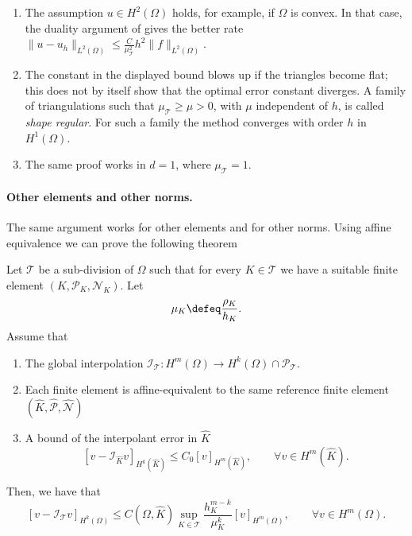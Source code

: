 \begin{remark}
    \begin{enumerate}
        \item The assumption $u \in H^2(\Omega)$ holds, for example, if $\Omega$ is convex. In that case, the duality argument of  gives the better rate $\| u - u_h \|_{L^2(\Omega)} \le \frac{C}{\mu_{\mathcal T}^2} h^2 \| f \|_{L^2(\Omega)}$.
        \item The constant in the displayed bound blows up if the triangles become flat; this does not by itself show that the optimal error constant diverges. A family of triangulations such that $\mu_{\mathcal T} \ge \mu > 0$, with $\mu$ independent of $h$, is called \emph{shape regular}. For such a family the method converges with order $h$ in $H^1(\Omega)$.
        \item The same proof works in $d = 1$, where $\mu_{\mathcal T} = 1$.
    \end{enumerate}
\end{remark}

\paragraph{Other elements and other norms.}
The same argument works for other elements and for other norms.
Using affine equivalence we can prove the following theorem
\begin{theorem}
    \label{thm:FEM interpolation error subdivision affine equivalence}
    Let $\mathcal T$ be a sub-division of $\Omega$ such that for every $K \in \mathcal T$ we have a suitable finite element $(K,\mathcal P_K, \mathcal N_K)$. Let
    \begin{equation*}
        \mu_{K} \defeq \frac{\rho_K}{h_K}.
    \end{equation*}
    Assume that
    \begin{enumerate}
        \item The global interpolation $\mathcal I_{\mathcal T} : H^m (\Omega) \to H^k (\Omega) \cap \mathcal P_{\mathcal T}$.
        \item
              Each finite element is affine-equivalent to the same reference finite element $(\widehat K,\widehat{\mathcal P}, \widehat{\mathcal N})$
        \item
              A bound of the interpolant error in $\widehat K$
              \begin{equation*}
                  \left[ v - \mathcal I_{\widehat K} v \right]_{H^k(\widehat K)} \le C_0 [ v]_{H^m (\widehat K)}, \qquad \forall v \in H^m (\widehat K).
              \end{equation*}
    \end{enumerate}
    Then, we have that
    \begin{equation*}
        \left[v - \mathcal I_{\mathcal T} v \right]_{H^k(\Omega)} \le C(\Omega, \widehat K)  \sup_{K \in \mathcal T} \frac{h_{K}^{m-k}}{\mu_K^k} [ v]_{H^m (\Omega)}, \qquad \forall v \in H^m(\Omega).
    \end{equation*}
\end{theorem}

